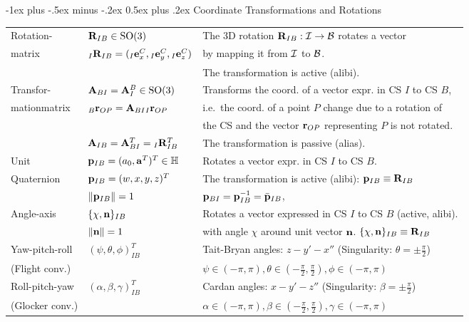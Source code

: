 \documentclass[10pt,landscape,a4paper]{article}
\makeatletter
\renewcommand{\section}{\@startsection{section}{1}{0mm}%
                                {-1ex plus -.5ex minus -.2ex}%
                                {0.5ex plus .2ex}%
                                {\normalfont\large\bfseries}}
\makeatother
\begin{document}
\begin{multicols}{2}
\section{Coordinate Transformations and Rotations}
\begin{tabular}{|l@{}|l@{}|l@{}|}
\hline
Rotation-  & $\mathbf R_{IB} \in \mathrm{SO}(3)$ & The 3D rotation $\mathbf R_{IB}:\mathcal{I} \rightarrow \mathcal{B}$ rotates a vector \\ 
matrix & ${}_I\mathbf R_{IB} = ({}_I\mathbf e_x^C, {}_I\mathbf e_y^C, {}_I\mathbf e_z^C)$ & by mapping it from $\mathcal{I}$ to $\mathcal{B}$. \\
& & The transformation is active (alibi).\\ \hline
Transfor- & $\mathbf A_{BI} = \mathbf A_{I}^{B}\in \mathrm{SO}(3)$ & Transforms the coord. of a vector expr. in CS $I$ to CS $B$,\\  
mationmatrix & ${}_{B}\mathbf r_{OP} = \mathbf A_{BI} {}_{I}\mathbf r_{OP}$ &  i.e.\ the coord. of a point $P$ change due to a rotation of \\
& &  the CS and the vector $\mathbf r_{OP}$ representing $P$ is not rotated. \\  
 & $\mathbf A_{IB} = \mathbf A_{BI}^T = {}_I \mathbf R_{IB}^T$ & The transformation is passive (alias).\\ \hline
 Unit  & $\mathbf p_{IB}=(a_0, \mathbf a^T)^T\in \mathbb{H}$ &  Rotates a vector expr. in CS $I$ to CS $B$. \\
Quaternion& $\mathbf p_{IB}=(w,x,y,z)^T$  & The transformation is active (alibi): $\mathbf p_{IB} \equiv \mathbf R_{IB}$\\ 
 & $\left\lVert\mathbf p_{IB}\right\rVert=1$  & $\mathbf p_{BI} = \mathbf p_{IB}^{-1} = \bar{\mathbf p}_{IB}$,  \\ \hline
Angle-axis & $\{\chi, \mathbf n\}_{IB}$ & Rotates a vector expressed in CS $I$ to CS $B$ (active, alibi). \\
& $\lVert\mathbf n\rVert=1$ & with angle $\chi$ around unit vector $\mathbf n$.  $\{\chi, \mathbf n\}_{IB} \equiv \mathbf R_{IB}$\\ \hline
Yaw-pitch-roll &  $(\psi, \theta, \phi)_{IB}^T$  & Tait-Bryan angles: $z-y'-x''$ (Singularity: $\theta=\pm\frac{\pi}{2}$) \\
 (Flight conv.) & & $\psi\in(-\pi,\pi), \theta\in(-\frac{\pi}{2},\frac{\pi}{2}), \phi\in(-\pi,\pi)$  \\  \hline
Roll-pitch-yaw &  $(\alpha, \beta, \gamma)_{IB}^T$ & Cardan angles: $x-y'-z''$ (Singularity: $\beta=\pm\frac{\pi}{2}$)  \\
 (Glocker conv.)& & $\alpha\in(-\pi,\pi), \beta\in(-\frac{\pi}{2},\frac{\pi}{2}), \gamma\in(-\pi,\pi)$  \\  \hline
\end{tabular} %

\end{multicols}
\end{document}
